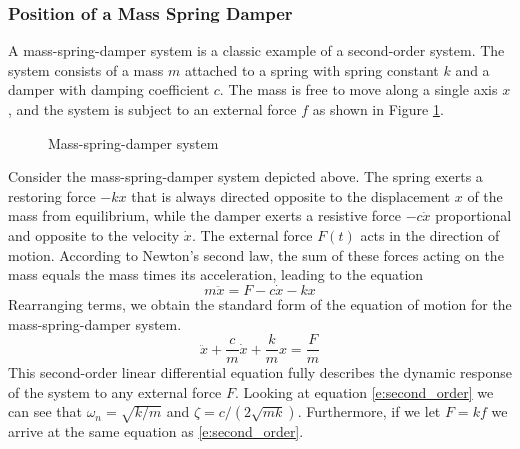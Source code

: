 \subsubsection{Position of a Mass Spring Damper}

A mass-spring-damper system is a classic example of a second-order system. The system consists of a mass $m$ attached to a spring with spring constant $k$ and a damper with damping coefficient $c$. The mass is free to move along a single axis $x$, and the system is subject to an external force $f$ as shown in Figure \ref{f:msd}.

\begin{figure}[H]
    \centering
    \caption{Mass-spring-damper system}
    \label{f:msd}
\end{figure}

Consider the mass-spring-damper system depicted above. The spring exerts a restoring force $-kx$ that is always directed opposite to the displacement $x$ of the mass from equilibrium, while the damper exerts a resistive force $-c\dot{x}$ proportional and opposite to the velocity $\dot{x}$. The external force $F(t)$ acts in the direction of motion. According to Newton's second law, the sum of these forces acting on the mass equals the mass times its acceleration, leading to the equation 
\begin{equation}
m\ddot{x} = F - c\dot{x} - kx 
\end{equation}
Rearranging terms, we obtain the standard form of the equation of motion for the mass-spring-damper system.
\begin{equation}
\ddot{x} + \frac{c}{m}\dot{x} + \frac{k}{m}x = \frac{F}{m}
\end{equation}
This second-order linear differential equation fully describes the dynamic response of the system to any external force $F$. Looking at equation \ref{e:second_order} we can see that $\omega_n = \sqrt{k/m}$ and $\zeta = c/(2\sqrt{mk})$. Furthermore, if we let $F = kf$ we arrive at the same equation as \ref{e:second_order}.

